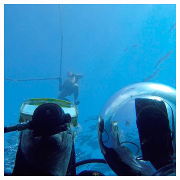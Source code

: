 \begin{figure}[!h]
\begin{subfigure}{0.3\textwidth}
        \caption{  }
        \label{fig:underwater_1}
    \end{subfigure}
    \begin{subfigure}{0.3\textwidth}
        \centering
        \includegraphics[width=1\textwidth]{figures/underwater_4.jpg}
        \caption{  }
        \label{fig:underwater_1}
    \end{subfigure}
\end{figure}